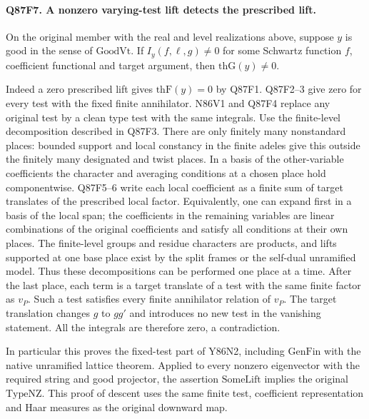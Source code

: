 \paragraph{Q87F7. A nonzero varying-test lift detects the prescribed lift.}
On the original member with the real and level realizations above,
suppose $y$ is good in the sense of $\mathrm{GoodVt}$. If
$I_y(f,\ell,g)\ne0$ for some Schwartz function $f$, coefficient
functional and target argument, then $\mathrm{thG}(y)\ne0$.

Indeed a zero prescribed lift gives $\mathrm{thF}(y)=0$ by Q87F1.
Q87F2--3 give zero for every test with the fixed finite annihilator.
N86V1 and Q87F4 replace any original test by a clean type test
with the same integrals. Use the finite-level decomposition described
in Q87F3. There are only finitely many nonstandard places:
bounded support and local constancy in the finite adeles give this
outside the finitely many designated and twist places. In a basis
of the other-variable coefficients the character and averaging
conditions at a chosen place hold componentwise. Q87F5--6 write
each local coefficient as a finite sum of target translates of
the prescribed local factor. Equivalently, one can expand first
in a basis of the local span; the coefficients in the remaining
variables are linear combinations of the original coefficients
and satisfy all conditions at their own places. The finite-level
groups and residue characters are products, and lifts supported at
one base place exist by the split frames or the self-dual unramified
model. Thus these decompositions can be performed one place at a
time. After the last place, each term is a target translate of a
test with the same finite factor as $v_P$. Such a test satisfies
every finite annihilator relation of $v_P$. The target translation
changes $g$ to $gg'$ and introduces no new test in the vanishing
statement. All the integrals are therefore zero, a contradiction.

In particular this proves the fixed-test part of Y86N2, including
$\mathrm{GenFin}$ with the native unramified lattice theorem.
Applied to every nonzero eigenvector with the required string and
good projector, the assertion $\mathrm{SomeLift}$ implies the
original $\mathrm{TypeNZ}$. This proof of descent uses the same
finite test, coefficient representation and Haar measures as the
original downward map.
